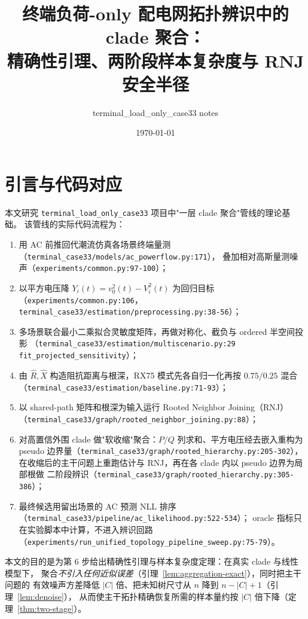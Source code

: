 \documentclass[UTF8,11pt]{ctexart}
\title{终端负荷-only 配电网拓扑辨识中的 clade 聚合：\\精确性引理、两阶段样本复杂度与 RNJ 安全半径}
\author{terminal\_load\_only\_case33 notes}
\date{\today}
\begin{document}
\maketitle

\section{引言与代码对应}

本文研究 \texttt{terminal\_load\_only\_case33} 项目中"一层 clade 聚合"管线的理论基础。
该管线的实际代码流程为：
\begin{enumerate}[leftmargin=2em]
  \item 用 AC 前推回代潮流仿真各场景终端量测
        （\texttt{terminal\_case33/models/ac\_powerflow.py:171}），
        叠加相对高斯量测噪声（\texttt{experiments/common.py:97-100}）；
  \item 以平方电压降 $Y_i(t)=v_0^2(t)-V_i^2(t)$ 为回归目标
        （\texttt{experiments/common.py:106}，\texttt{terminal\_case33/estimation/preprocessing.py:38-56}）；
  \item 多场景联合最小二乘拟合灵敏度矩阵，再做对称化、截负与 ordered 半空间投影
        （\texttt{terminal\_case33/estimation/multiscenario.py:29} \texttt{fit\_projected\_sensitivity}）；
  \item 由 $\widehat R,\widehat X$ 构造阻抗距离与根深，RX75 模式先各自归一化再按
        $0.75/0.25$ 混合（\texttt{terminal\_case33/estimation/baseline.py:71-93}）；
  \item 以 shared-path 矩阵和根深为输入运行 Rooted Neighbor Joining（RNJ）
        （\texttt{terminal\_case33/graph/rooted\_neighbor\_joining.py:88}）；
  \item 对高置信外围 clade 做"软收缩"聚合：$P/Q$ 列求和、平方电压经去嵌入重构为
        pseudo 边界量（\texttt{terminal\_case33/graph/rooted\_hierarchy.py:205-302}），
        在收缩后的主干问题上重跑估计与 RNJ，再在各 clade 内以 pseudo 边界为局部根做
        二阶段辨识（\texttt{terminal\_case33/graph/rooted\_hierarchy.py:305-386}）；
  \item 最终候选用留出场景的 AC 预测 NLL 排序
        （\texttt{terminal\_case33/pipeline/ac\_likelihood.py:522-534}）；
        oracle 指标只在实验脚本中计算，不进入辨识回路
        （\texttt{experiments/run\_unified\_topology\_pipeline\_sweep.py:75-79}）。
\end{enumerate}

本文的目的是为第 6 步给出精确性引理与样本复杂度定理：在真实 clade 与线性模型下，
聚合\emph{不引入任何近似误差}（引理~\ref{lem:aggregation-exact}），同时把主干问题的
有效噪声方差降低 $|C|$ 倍、把未知树尺寸从 $n$ 降到 $n-|C|+1$（引理~\ref{lem:denoise}），
从而使主干拓扑精确恢复所需的样本量约按 $|C|$ 倍下降（定理~\ref{thm:two-stage}）。
\end{document}
